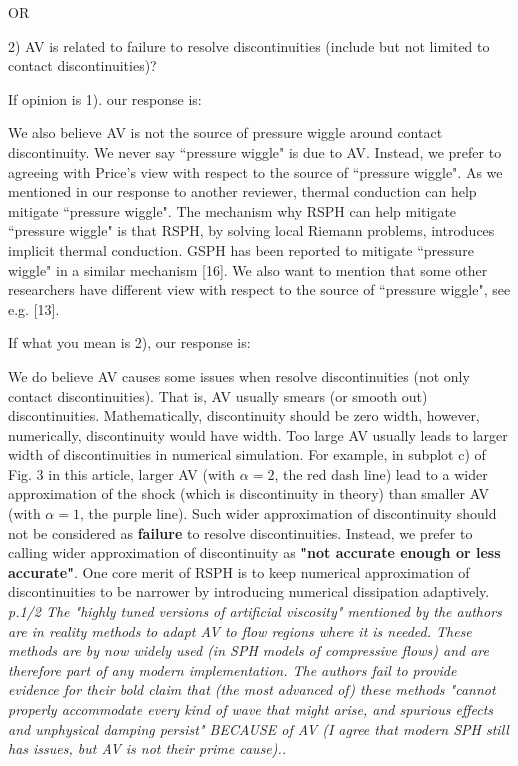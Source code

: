 \documentclass[10pt,a4paper]{article}
\begin{document}
OR
 
2) AV is related to failure to resolve discontinuities (include but not limited to contact discontinuities)? 

If opinion is 1). our response is: 

We also believe AV is not the source of pressure wiggle around contact discontinuity.
We never say ``pressure wiggle" is due to AV. Instead, we prefer to agreeing with Price's view with respect to the source of ``pressure wiggle". As we mentioned in our response to another reviewer, thermal conduction can help mitigate ``pressure wiggle". The mechanism why RSPH can help mitigate ``pressure wiggle" is that RSPH, by solving local Riemann problems, introduces implicit thermal conduction. GSPH has been reported to mitigate ``pressure wiggle" in a similar mechanism [16]. We also want to mention that some other researchers have different view with respect to the source of ``pressure wiggle", see e.g. [13].

If what you mean is 2), our response is:

We do believe AV causes some issues when resolve discontinuities (not only contact discontinuities). That is, AV usually smears (or smooth out) discontinuities. Mathematically, discontinuity should be zero width, however, numerically, discontinuity would have width. Too large AV usually leads to larger width of discontinuities in numerical simulation. For example, in subplot c) of Fig. 3 in this article, larger AV (with $\alpha = 2$, the red dash line) lead to a wider approximation of the shock (which is discontinuity in theory) than smaller AV (with $\alpha = 1$, the purple line). 
Such wider approximation of discontinuity should not be considered as \textbf{failure} to resolve discontinuities. Instead, we prefer to calling wider approximation of discontinuity as \textbf{"not accurate enough or less accurate"}. One core merit of RSPH is to keep numerical approximation of discontinuities to be narrower by introducing numerical dissipation adaptively.
\\[3pt]
 
\textit{p.1/2 The "highly tuned versions of artificial viscosity" mentioned by the authors are in reality methods to adapt AV to flow regions where it is needed. These methods are by now widely used (in SPH models of compressive flows) and are therefore part of any modern implementation.
The authors fail to provide evidence for their bold claim that (the most advanced of) these methods "cannot properly accommodate every kind of wave that might arise, and spurious effects and unphysical damping persist" BECAUSE of AV (I agree that modern SPH still has issues, but AV is not their prime cause)..}
\end{document}
